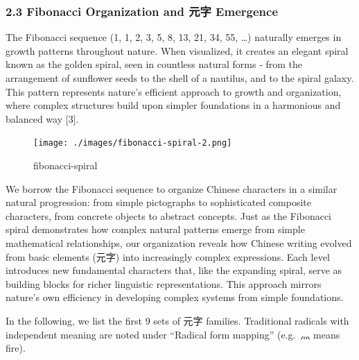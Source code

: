 \documentclass[
  11pt,
  letterpaper,
]{article}
\begin{document}
\subsubsection{2.3 Fibonacci Organization and 元字
Emergence}\label{fibonacci-organization-and-ux5143ux5b57-emergence}

The Fibonacci sequence (1, 1, 2, 3, 5, 8, 13, 21, 34, 55, \ldots)
naturally emerges in growth patterns throughout nature. When visualized,
it creates an elegant spiral known as the golden spiral, seen in
countless natural forms - from the arrangement of sunflower seeds to the
shell of a nautilus, and to the spiral galaxy. This pattern represents
nature's efficient approach to growth and organization, where complex
structures build upon simpler foundations in a harmonious and balanced
way {[}3{]}.

\begin{figure}
\centering
\texttt{[image: ./images/fibonacci-spiral-2.png]}
\caption{fibonacci-spiral}
\end{figure}

We borrow the Fibonacci sequence to organize Chinese characters in a
similar natural progression: from simple pictographs to sophisticated
composite characters, from concrete objects to abstract concepts. Just
as the Fibonacci spiral demonstrates how complex natural patterns emerge
from simple mathematical relationships, our organization reveals how
Chinese writing evolved from basic elements (元字) into increasingly
complex expressions. Each level introduces new fundamental characters
that, like the expanding spiral, serve as building blocks for richer
linguistic representations. This approach mirrors nature's own
efficiency in developing complex systems from simple foundations.

In the following, we list the first 9 sets of 元字 families. Traditional
radicals with independent meaning are noted under ``Radical form
mapping'' (e.g.~灬 means fire).
\end{document}
